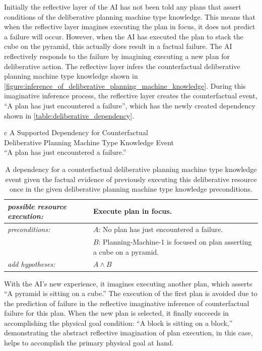 Initially the reflective layer of the AI has not been told any plans
that assert conditions of the deliberative planning machine type
knowledge.  This means that when the reflective layer imagines
executing the plan in focus, it does not predict a failure will occur.
However, when the AI has executed the plan to stack the cube on the
pyramid, this actually does result in a factual failure.  The AI
reflectively responds to the failure by imagining executing a new plan
for deliberative action.  The reflective layer infers the
counterfactual deliberative planning machine type knowledge shown in
{\mbox{\autoref{figure:inference_of_deliberative_planning_machine_knowledge}}}.
During this imaginative inference process, the reflective layer
creates the counterfactual event, ``A plan has just encountered a
failure'', which has the newly created dependency shown in
{\mbox{\autoref{table:deliberative_dependency}}}.
\begin{table}[h]
\centering
\begin{tabular}{c}
  A Supported Dependency for Counterfactual \\
  Deliberative Planning Machine Type Knowledge Event \\
  ``A plan has just encountered a failure.'' \\
  \begin{tabular}{|p{3cm}|p{6cm}|}
    \hline
    \emph{possible resource execution:} & Execute plan in focus. \\
    \hline
    \emph{preconditions:}               & $A$: No plan has just encountered a failure. \\
                                        & $B$: Planning-Machine-1 is focused on plan asserting a cube on a pyramid. \\
    \hline
    \emph{add hypotheses:}              & $A \wedge B$ \\
    \hline
  \end{tabular}
\end{tabular}
\caption[A dependency for a counterfactual deliberative planning
  machine type knowledge event given no factual evidence.]{A
  dependency for a counterfactual deliberative planning machine type
  knowledge event given the factual evidence of previously executing
  this deliberative resource once in the given deliberative planning
  machine type knowledge preconditions.}
\label{table:deliberative_dependency}
\end{table}
With the AI's new experience, it imagines executing another plan,
which asserts ``A pyramid is sitting on a cube.''  The execution of
the first plan is avoided due to the prediction of failure in the
reflective imaginative inference of counterfactual failure for this
plan.  When the new plan is selected, it finally succeeds in
accomplishing the physical goal condition: ``A block is sitting on a
block,'' demonstrating the abstract reflective imagination of plan
execution, in this case, helps to accomplish the primary physical goal
at hand.

